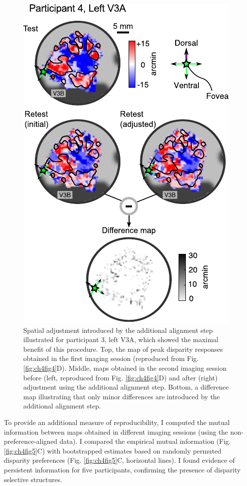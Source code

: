 \begin{figure}
  \centering
  \includegraphics{fig6}
  \caption[Spatial adjustment step.]{Spatial adjustment introduced by the additional alignment step illustrated for participant 3, left V3A, which showed the maximal benefit of this procedure. Top, the map of peak disparity responses obtained in the first imaging session (reproduced from Fig. \ref{fig:ch4fig4}D). Middle, maps obtained in the second imaging session before (left, reproduced from Fig. \ref{fig:ch4fig4}D) and after (right) adjustment using the additional alignment step. Bottom, a difference map illustrating that only minor differences are introduced by the additional alignment step.}
  \label{fig:ch4fig6}
\end{figure}


To provide an additional measure of reproducibility, I computed the mutual information \cite{Shannon1948,shannon1949} between maps obtained in different imaging sessions (using the non-preference-aligned data). I compared the empirical mutual information (Fig. \ref{fig:ch4fig5}C) with bootstrapped estimates based on randomly permuted disparity preferences (Fig. \ref{fig:ch4fig5}C, horizontal lines). I found evidence of persistent information for five participants, confirming the presence of disparity selective structures.

